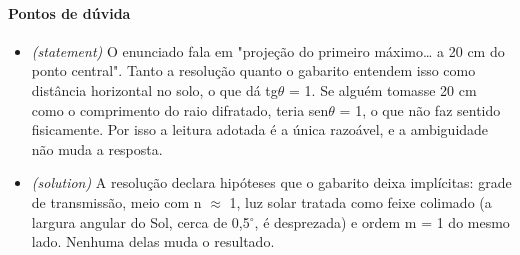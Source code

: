 \documentclass{article}%
\begin{document}
\paragraph{Pontos de dúvida}%
\begin{itemize}%
\item%
\textit{(statement)} O enunciado fala em "projeção do primeiro máximo\ldots{} a 20 cm do ponto central". Tanto a resolução quanto o gabarito entendem isso como distância horizontal no solo, o que dá tg$\theta$ = 1. Se alguém tomasse 20 cm como o comprimento do raio difratado, teria sen$\theta$ = 1, o que não faz sentido fisicamente. Por isso a leitura adotada é a única razoável, e a ambiguidade não muda a resposta.%
\item%
\textit{(solution)} A resolução declara hipóteses que o gabarito deixa implícitas: grade de transmissão, meio com n $\approx$ 1, luz solar tratada como feixe colimado (a largura angular do Sol, cerca de 0,5$^\circ$, é desprezada) e ordem m = 1 do mesmo lado. Nenhuma delas muda o resultado.%
\end{itemize}%
\end{document}
